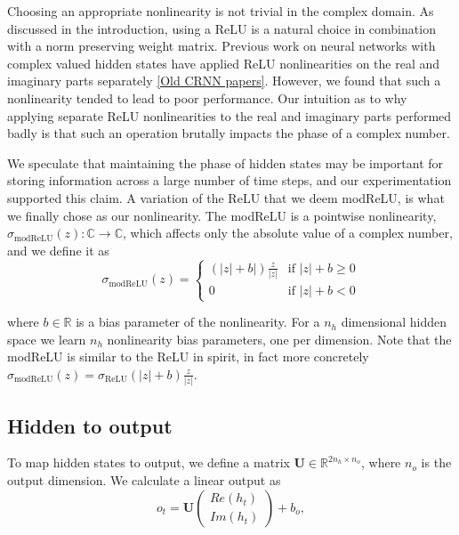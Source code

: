 \documentclass{article} %
\newcommand{\matr}[1]{\mathbf{#1}}
\newcommand\RR{\mathbb{R}}
\newcommand\CC{\mathbb{C}}
\begin{document}
Choosing an appropriate nonlinearity is not trivial in the complex domain.
As discussed in the introduction, using a ReLU is a natural choice in combination with a norm preserving
weight matrix. {\color{red}Previous work on neural networks with complex valued} hidden states 
have applied ReLU nonlinearities on the real and imaginary parts separately \ref{Old CRNN papers}.
However, we found that such a nonlinearity {\color{red}tended to lead to} poor performance.
Our intuition as to why applying separate ReLU nonlinearities to the real 
and imaginary parts performed badly is that such an operation brutally impacts the 
phase of a complex number.

We speculate that maintaining the phase of hidden states may be important for storing information 
across a large number of time steps, and our experimentation supported this claim.
A variation of the ReLU that we deem modReLU, is what we 
finally chose as our nonlinearity. The modReLU is a pointwise nonlinearity,  
$\sigma_\mathrm{modReLU} (z) : \CC \rightarrow \CC$, which
affects only the absolute value of a complex number, and we define it as 
\begin{equation} \sigma_\mathrm{modReLU} (z) = 
\left\{
  \begin{array}{ll}
    (|z|+b|) \frac{z}{|z|}  & \mbox{if } |z| + b \geq 0 \\
    0 & \mbox{if } |z| + b < 0
  \end{array}
\right.
\end{equation}

where $b \in \RR$ is a bias parameter of the nonlinearity. For a $n_h$ dimensional hidden space
we learn $n_h$ nonlinearity bias parameters, one per dimension. 
Note that the modReLU is similar to the ReLU in spirit, in fact more concretely
$\sigma_\mathrm{modReLU}(z) = \sigma_\mathrm{ReLU}(|z| + b) \frac{z}{|z|}$. 

\subsection{Hidden to output}

To map hidden states to output, we define a matrix $\matr{U} \in \RR^{2n_h \times n_o}$, 
where $n_o$ is the output dimension. We calculate a linear output as
\begin{equation} o_t = \matr{U} \begin{pmatrix} Re(h_t) \\ Im(h_t) \end{pmatrix} + b_o , \end{equation}
\end{document}
